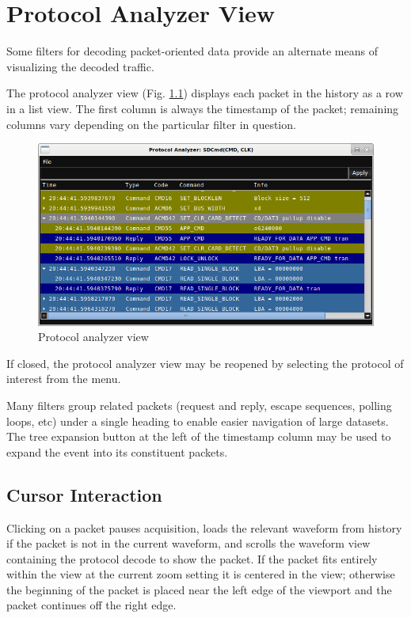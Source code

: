 \chapter{Protocol Analyzer View}
\label{chapter:protoanalyzer}

Some filters for decoding packet-oriented data provide an alternate means of visualizing the decoded traffic.

The protocol analyzer view (Fig. \ref{proto-analyzer}) displays each packet in the history as a row in a list view. The
first column is always the timestamp of the packet; remaining columns vary depending on the particular filter in
question.

\begin{figure}[H]
\centering
\includegraphics[width=14cm]{images/proto-analyzer.png}
\caption{Protocol analyzer view}
\label{proto-analyzer}
\end{figure}

If closed, the protocol analyzer view may be reopened by selecting the protocol of interest from the
 menu.

Many filters group related packets (request and reply, escape sequences, polling loops, etc) under a single heading to
enable easier navigation of large datasets. The tree expansion button at the left of the timestamp column may be used
to expand the event into its constituent packets.

\section{Cursor Interaction}

Clicking on a packet pauses acquisition, loads the relevant waveform from history if the packet is not in the current
waveform, and scrolls the waveform view containing the protocol decode to show the packet. If the packet fits entirely
within the view at the current zoom setting it is centered in the view; otherwise the beginning of the packet is placed
near the left edge of the viewport and the packet continues off the right edge.


